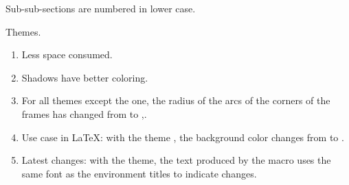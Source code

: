 \documentclass{tutodoc}
\begin{document}
\begin{tdocupdate}
	\item Sub-sub-sections are numbered in lower case.

	\item Themes.
	\begin{enumerate}
		\item Less space consumed.

		\item Shadows have better coloring.

		\item For all themes except the  one, the radius of the arcs of the corners of the frames has changed from \tdoclatexin{.75mm} to \tdoclatexin{.2pt},.

 		\item Use case in \LaTeX: with the theme , the background color changes from  to .

		\item Latest changes: with the  theme, the \tdoclatexin{[Init]} text produced by the  macro uses the same font as the environment titles to indicate changes.
	\end{enumerate}
\end{tdocupdate}
\end{document}
